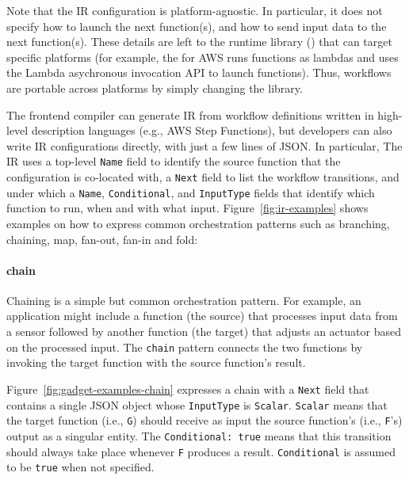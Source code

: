 Note that the IR configuration is platform-agnostic. In particular, it does
not specify how to launch the next function(s), and how to send input data to
the next function(s). These details are left to the \name{} runtime library
(\deorc{}) that can target specific platforms (for example, the \deorc{} for
AWS runs functions as lambdas and uses the Lambda asychronous invocation API
to launch functions). Thus, workflows are portable across platforms by simply
changing the \deorc{} library.

The \name{} frontend compiler can generate IR from workflow definitions
written in high-level description languages (e.g., AWS Step Functions), but
developers can also write IR configurations directly, with just a few lines of
JSON. In particular, The \name{} IR uses a top-level \texttt{Name} field to
identify the source function that the configuration is co-located with, a
\texttt{Next} field to list the workflow transitions, and under which a
\texttt{Name}, \texttt{Conditional}, and \texttt{InputType} fields that
identify which function to run, when and with what input.
Figure~\ref{fig:ir-examples} shows examples on how to express common
orchestration patterns such as branching, chaining, map, fan-out, fan-in and
fold: 



\paragraph{chain}

Chaining is a simple but common orchestration pattern. For example, an
application might include a function (the source) that processes input data
from a sensor followed by another function (the target) that adjusts an
actuator based on the processed input. The \texttt{chain} pattern connects the
two functions by invoking the target function with the source function's
result.

Figure~\ref{fig:gadget-examples-chain} expresses a chain with a \texttt{Next}
field that contains a single JSON object whose \texttt{InputType} is
\texttt{Scalar}. \texttt{Scalar} means that the target function (i.e.,
\texttt{G}) should receive as input the source function's (i.e., \texttt{F}'s)
output as a singular entity. The \texttt{Conditional: true} means that this
transition should always take place whenever \texttt{F} produces a result.
\texttt{Conditional} is assumed to be \texttt{true} when not specified.

